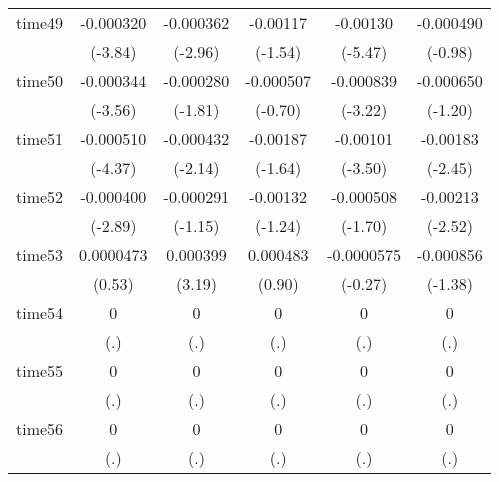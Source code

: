 \begin{table}[htbp]
\begin{tabular}{l*{5}{c}}
time49      &   -0.000320\sym{***}&   -0.000362\sym{**} &    -0.00117         &    -0.00130\sym{***}&   -0.000490         \\
            &     (-3.84)         &     (-2.96)         &     (-1.54)         &     (-5.47)         &     (-0.98)         \\
time50      &   -0.000344\sym{***}&   -0.000280         &   -0.000507         &   -0.000839\sym{**} &   -0.000650         \\
            &     (-3.56)         &     (-1.81)         &     (-0.70)         &     (-3.22)         &     (-1.20)         \\
time51      &   -0.000510\sym{***}&   -0.000432\sym{*}  &    -0.00187         &    -0.00101\sym{***}&    -0.00183\sym{*}  \\
            &     (-4.37)         &     (-2.14)         &     (-1.64)         &     (-3.50)         &     (-2.45)         \\
time52      &   -0.000400\sym{**} &   -0.000291         &    -0.00132         &   -0.000508         &    -0.00213\sym{*}  \\
            &     (-2.89)         &     (-1.15)         &     (-1.24)         &     (-1.70)         &     (-2.52)         \\
time53      &   0.0000473         &    0.000399\sym{**} &    0.000483         &  -0.0000575         &   -0.000856         \\
            &      (0.53)         &      (3.19)         &      (0.90)         &     (-0.27)         &     (-1.38)         \\
time54      &           0         &           0         &           0         &           0         &           0         \\
            &         (.)         &         (.)         &         (.)         &         (.)         &         (.)         \\
time55      &           0         &           0         &           0         &           0         &           0         \\
            &         (.)         &         (.)         &         (.)         &         (.)         &         (.)         \\
time56      &           0         &           0         &           0         &           0         &           0         \\
            &         (.)         &         (.)         &         (.)         &         (.)         &         (.)         \\

\end{tabular}
\end{table}
